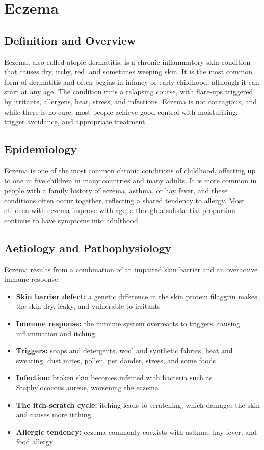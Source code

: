 \chapter{Eczema}

\section*{Definition and Overview}
Eczema, also called atopic dermatitis, is a chronic inflammatory skin condition that causes dry, itchy, red, and sometimes weeping skin. It is the most common form of dermatitis and often begins in infancy or early childhood, although it can start at any age. The condition runs a relapsing course, with flare-ups triggered by irritants, allergens, heat, stress, and infections. Eczema is not contagious, and while there is no cure, most people achieve good control with moisturising, trigger avoidance, and appropriate treatment.

\section*{Epidemiology}
Eczema is one of the most common chronic conditions of childhood, affecting up to one in five children in many countries and many adults. It is more common in people with a family history of eczema, asthma, or hay fever, and these conditions often occur together, reflecting a shared tendency to allergy. Most children with eczema improve with age, although a substantial proportion continue to have symptoms into adulthood.

\section*{Aetiology and Pathophysiology}
Eczema results from a combination of an impaired skin barrier and an overactive immune response.
\begin{itemize}
    \item \textbf{Skin barrier defect:} a genetic difference in the skin protein filaggrin makes the skin dry, leaky, and vulnerable to irritants
    \item \textbf{Immune response:} the immune system overreacts to triggers, causing inflammation and itching
    \item \textbf{Triggers:} soaps and detergents, wool and synthetic fabrics, heat and sweating, dust mites, pollen, pet dander, stress, and some foods
    \item \textbf{Infection:} broken skin becomes infected with bacteria such as Staphylococcus aureus, worsening the eczema
    \item \textbf{The itch-scratch cycle:} itching leads to scratching, which damages the skin and causes more itching
    \item \textbf{Allergic tendency:} eczema commonly coexists with asthma, hay fever, and food allergy
\end{itemize}

